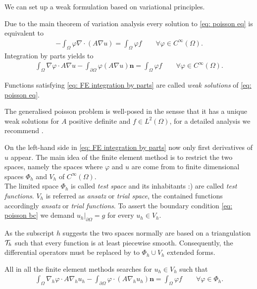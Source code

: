 We can set up a weak formulation based on variational principles.

Due to the main theorem of variation analysis every solution to \eqref{eq: poisson eq} is equivalent to 
\begin{align}
	-\int_\Omega \varphi \nabla \cdot (A \nabla u) = \int_\Omega \varphi f \qquad \forall \varphi \in C^\infty(\Omega).
\end{align}
Integration by parts yields to
\begin{align}
	\int_\Omega \nabla \varphi  \cdot A\nabla u -\int_{\partial \Omega} \varphi (A\nabla u) \mathbf{n}  = \int_\Omega \varphi f \qquad \forall \varphi \in C^\infty(\Omega). \label{eq: FE integration by parts}
\end{align}
\begin{definition}
	Functions satisfying \eqref{eq: FE integration by parts} are called \emph{weak solutions} of \eqref{eq: poisson eq}.
\end{definition}
The generalised poisson problem is well-posed in the sensse that it has a unique weak solutions for $A$ positive definite and $f\in L^2(\Omega)$, for a detailed analysis we recommend \cite[Chapter~6]{Evans1998}.

On the left-hand side in \eqref{eq: FE integration by parts} now only first derivatives of $u$ appear.
The main idea of the finite element method is to restrict the two spaces, namely the spaces where $\varphi$ and $u$ are come from to finite dimensional spaces $\Phi_h$ and $V_h$ of $C^\infty(\Omega)$.\\
The limited space $\Phi_h$ is called \emph{test space} and its inhabitants :) are called \emph{test functions}. $V_h$ is referred as \emph{ansatz} or \emph{trial space},  the contained functions accordingly \emph{ansatz} or \emph{trial functions}. To assert the boundary condition \eqref{eq: poisson bc} we demand $u_h|_{\partial \Omega} = g$ for every $u_h \in V_h$.

As the subscript $h$ suggests the two spaces normally are based on a triangulation $\mathcal{T}_h$ such that every function is at least piecewise smooth. Consequently, the differential operators must be replaced by to $\Phi_h \cup V_h$ extended forms.

All in all the finite element methods searches for $u_h \in V_h$ such that 
\begin{align}
	\int_\Omega \nabla_h \varphi  \cdot A\nabla_h u_h -\int_{\partial \Omega} \varphi  \cdot (A\nabla_h u_h) \mathbf{n}  = \int_\Omega \varphi f \qquad \forall \varphi \in \Phi_h. \label{eq: weak formulation fe}
\end{align}


